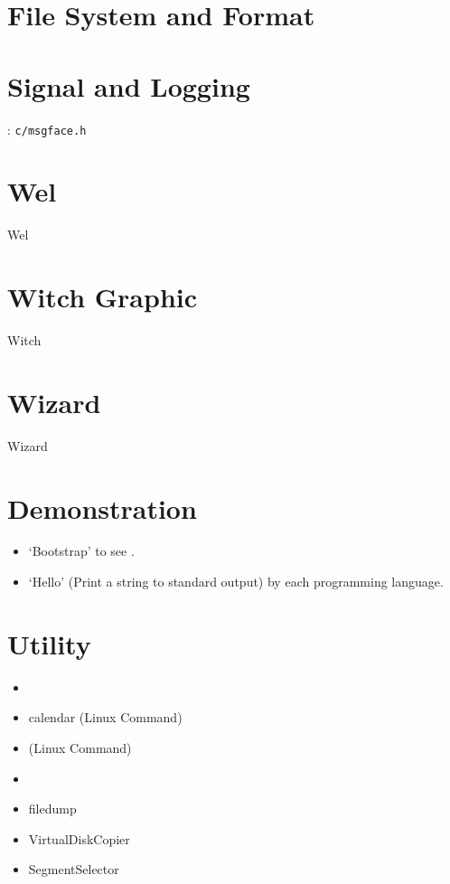 \section{File System and Format}


\section{Signal and Logging}

: \verb`c/msgface.h`





\section{Wel}
{Wel}

\section{Witch Graphic} 
{Witch}

\section{Wizard}
{Wizard}

\section{Demonstration}

\begin{itemize}
	\item `Bootstrap' to see .
	\item `Hello' (Print a string to standard output) by each programming language. 
\end{itemize}

\section{Utility}

\begin{itemize}
\item {}
\item {}    calendar (Linux Command)
\item {}  (Linux Command)
\item {}
\item {}  filedump
\item {}  VirtualDiskCopier
\item {} SegmentSelector
\end{itemize}

